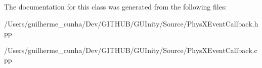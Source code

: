 The documentation for this class was generated from the following files\+:\begin{DoxyCompactItemize}
\item 
/\+Users/guilherme\+\_\+cunha/\+Dev/\+G\+I\+T\+H\+U\+B/\+G\+U\+Inity/\+Source/Phys\+X\+Event\+Callback.\+hpp\item 
/\+Users/guilherme\+\_\+cunha/\+Dev/\+G\+I\+T\+H\+U\+B/\+G\+U\+Inity/\+Source/Phys\+X\+Event\+Callback.\+cpp\end{DoxyCompactItemize}
